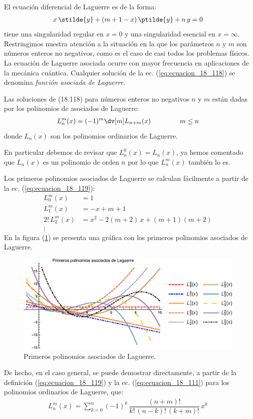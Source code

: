 El ecuación diferencial de Laguerre es de la forma:
\begin{align}
x \, \stilde{y} + (m +  1 - x) \, \ptilde{y} + n \, y = 0
\label{eq:ecuacion_18_118}
\end{align}
tiene una singularidad regular en $x = 0$ y una singularidad esencial en $x = \infty$. Restringimos nuestra atención a la situación en la que los parámetros $n$ y $m$ son números enteros no negativos, como es el caso de casi todos los problemas físicos. La ecuación de Laguerre asociada ocurre con mayor frecuencia en aplicaciones de la mecánica cuántica. Cualquier solución de la ec. (\ref{eq:ecuacion_18_118}) se denomina \emph{función asociada de Laguerre}.
\par
Las soluciones de (18.118) para números enteros no negativos $n$ y $m$ están dadas por los polinomios de asociados de Laguerre:
\begin{align}
L_{n}^{m} (x) = (-1)^{m} \dv[m] L_{n+m} (x) \hspace{1.5cm} m \leq n
\label{eq:ecuacion_18_119}
\end{align}
donde $L_{n}(x)$ son los polinomios ordinarios de Laguerre.
\par
En particular debemos de revisar que $L_{n}^{0} (x) = L_{n}(x)$, ya hemos comentado que $L_{n}(x)$ es un polinomio de orden $n$ por lo que $L_{n}^{m} (x)$ también lo es.
\par
Los primeros polinomios asociados de Laguerre se calculan fácilmente a partir de la ec. (\ref{eq:ecuacion_18_119}):
\begin{align*}
L_{0}^{m} (x) &= 1 \\[0.5em]
L_{1}^{m} (x) &= -x + m + 1 \\[0.5em]
2! \, L_{2}^{m} (x) &= x^{2} - 2 (m + 2) \, x + (m + 1)(m + 2) \\[0.5em]
\vdots
\end{align*}
En la figura (\ref{fig:grafica_Laguerre_02}) se presenta una gráfica con los primeros polinomios asociados de Laguerre.
\begin{figure}[H]
    \centering
    \includegraphics[scale=1]{Imagenes/Polinomios_Laguerre_04.eps}
    \caption{Primeros polinomios asociados de Laguerre.}
    \label{fig:grafica_Laguerre_02}
\end{figure}
De hecho, en el caso general, se puede demostrar directamente, a partir de la definición (\ref{eq:ecuacion_18_119}) y la ec. (\ref{eq:ecuacion_18_111}) para los polinomios ordinarios de Laguerre, que:
\begin{align}
L_{n}^{m} (x) = \sum_{k=0}^{n} (-1)^{k} \, \dfrac{(n + m)!}{k! \, (n - k)! \, (k + m)!} \, x^{k}
\label{eq:ecuacion_18_120}
\end{align}

